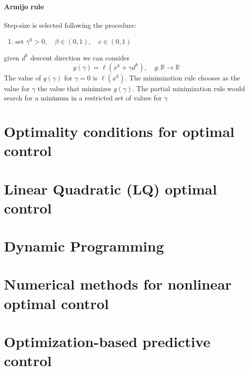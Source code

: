 \documentclass{book}
\newcommand{\R}{\mathbb{R}}
\begin{document}
\subsubsection{Armijo rule}
Step-size is selected following the procedure: 
\begin{enumerate}
    \item set $\bar{\gamma}^0>0,\quad \beta\in(0,1),\quad c\in(0,1)$
\end{enumerate}
given $d^k$ descent direction we can consider 
\[
    g(\gamma) = \ell(x^k+\gamma d^k), \quad g:\R\to\R
\]
The value of $g(\gamma)$ for $\gamma=0$ is $\ell(x^k)$. The minimization rule chooses as the value for $\gamma$ the value that minimizes $g(\gamma)$. The partial minimization rule would search for a minimum in a restricted set of values for $\gamma$























\chapter{Optimality conditions for optimal control}





\chapter{Linear Quadratic (LQ) optimal control}


\chapter{Dynamic Programming}



\chapter{Numerical methods for nonlinear optimal control}




\chapter{Optimization-based predictive control}
\end{document}
